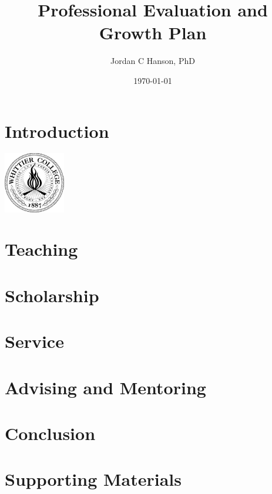 \documentclass[10pt,oneside]{book}
\title{Professional Evaluation and Growth Plan}
\author{Jordan C Hanson, PhD}
\date{\today}
\begin{document}
\maketitle
\tableofcontents

\chapter{Introduction}
\centering
\includegraphics[width=0.2\textwidth]{figures/WhittierCollegeSeal.png}
\begin{flushleft}

\end{flushleft}

\chapter{Teaching}
\begin{flushleft}

\end{flushleft}

\chapter{Scholarship}
\begin{flushleft}

\end{flushleft}

\chapter{Service}
\begin{flushleft}

\end{flushleft}

\chapter{Advising and Mentoring}
\begin{flushleft}

\end{flushleft}

\chapter{Conclusion}
\begin{flushleft}

\end{flushleft}

\chapter{Supporting Materials}
\begin{flushleft}

\end{flushleft}



 
\end{document}

